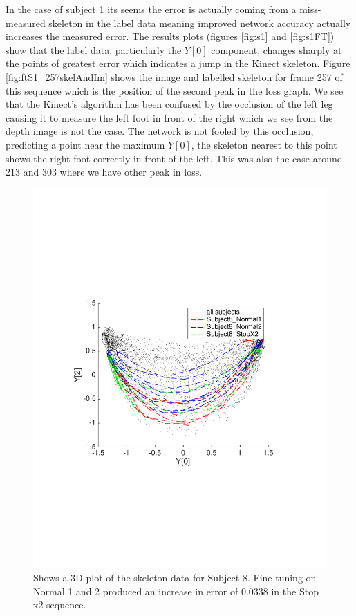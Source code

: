 \documentclass[11pt]{article} %
\begin{document}
In the case of subject 1 its seems the error is actually coming from a miss-measured skeleton in the label data meaning improved network accuracy actually increases the measured error. The results plots (figures \ref{fig:s1} and \ref{fig:s1FT}) show that the label data, particularly the $Y[0]$ component, changes sharply at the points of greatest error which indicates a jump in the Kinect skeleton. Figure \ref{fig:ftS1_257skelAndIm} shows the image and labelled skeleton for frame 257 of this sequence which is the position of the second peak in the loss graph. We see that the Kinect's algorithm has been confused by the occlusion of the left leg causing it to measure the left foot in front of the right which we see from the depth image is not the case. The network is not fooled by this occlusion, predicting a point near the maximum $Y[0]$, the skeleton nearest to this point shows the right foot correctly in front of the left. This was also the case around 213 and 303 where we have other peak in loss. 

\begin{figure}
\centering
\includegraphics*[width=0.65\linewidth,trim={0.5cm 7.5cm 2.3cm 8.2cm},clip]{finetuning_s8.pdf} 
\caption{Shows a 3D plot of the skeleton data for Subject 8. Fine tuning on Normal 1 and 2 produced an increase in error of 0.0338 in the Stop x2 sequence.}
\label{fig:ftS8}
\end{figure}
\end{document}
